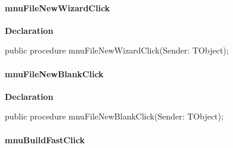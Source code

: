 \documentclass{report}
\newif\ifpdf
\begin{document}
\paragraph*{mnuFileNewWizardClick}\hspace*{\fill}

\label{editor.TFrmEditor-mnuFileNewWizardClick}
\begin{list}{}{
\setlength{\itemindent}{0cm}
\setlength{\listparindent}{0cm}
\setlength{\leftmargin}{\evensidemargin}
\addtolength{\leftmargin}{\tmplength}
\settowidth{\labelsep}{X}
\addtolength{\leftmargin}{\labelsep}
\setlength{\labelwidth}{\tmplength}
}
\item[\textbf{Declaration}\hfill]
\ifpdf
\begin{flushleft}
\fi
\begin{ttfamily}
public procedure mnuFileNewWizardClick(Sender: TObject);\end{ttfamily}

\ifpdf
\end{flushleft}
\fi

\end{list}
\paragraph*{mnuFileNewBlankClick}\hspace*{\fill}

\label{editor.TFrmEditor-mnuFileNewBlankClick}
\begin{list}{}{
\setlength{\itemindent}{0cm}
\setlength{\listparindent}{0cm}
\setlength{\leftmargin}{\evensidemargin}
\addtolength{\leftmargin}{\tmplength}
\settowidth{\labelsep}{X}
\addtolength{\leftmargin}{\labelsep}
\setlength{\labelwidth}{\tmplength}
}
\item[\textbf{Declaration}\hfill]
\ifpdf
\begin{flushleft}
\fi
\begin{ttfamily}
public procedure mnuFileNewBlankClick(Sender: TObject);\end{ttfamily}

\ifpdf
\end{flushleft}
\fi

\end{list}
\paragraph*{mnuBuildFastClick}\hspace*{\fill}
\end{document}

